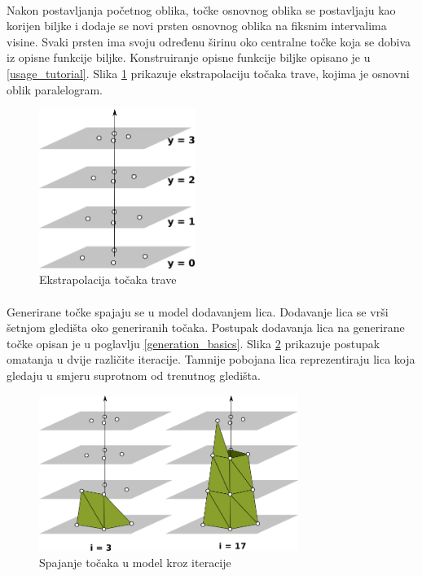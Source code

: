 \documentclass[times, utf8, diplomski]{fer}
\begin{document}
\paragraph{}
Nakon postavljanja početnog oblika, točke osnovnog oblika se postavljaju kao korijen biljke 
i dodaje se novi prsten osnovnog oblika na fiksnim intervalima visine. Svaki prsten ima 
svoju određenu širinu oko centralne točke koja se dobiva iz opisne funkcije biljke. Konstruiranje opisne funkcije biljke opisano je u \ref{usage_tutorial}. Slika \ref{fig:22-2} prikazuje ekstrapolaciju točaka trave, kojima je osnovni oblik paralelogram.

\begin{figure}[h]
	\centering
	\includegraphics[width=0.45\textwidth]{img/22-2}
	\caption{Ekstrapolacija točaka trave}
	\label{fig:22-2}
\end{figure}

\paragraph{}
Generirane točke spajaju se u model dodavanjem lica. Dodavanje lica se vrši šetnjom gledišta oko generiranih točaka. Postupak dodavanja lica na generirane točke opisan je u poglavlju \ref{generation_basics}. Slika \ref{fig:22-3} prikazuje postupak omatanja u dvije različite iteracije. Tamnije pobojana lica reprezentiraju lica koja gledaju u smjeru suprotnom od trenutnog gledišta.

\begin{figure}[h]
	\centering
	\includegraphics[width=0.75\textwidth]{img/22-3}
	\caption{Spajanje točaka u model kroz iteracije}
	\label{fig:22-3}
\end{figure}
\end{document}
